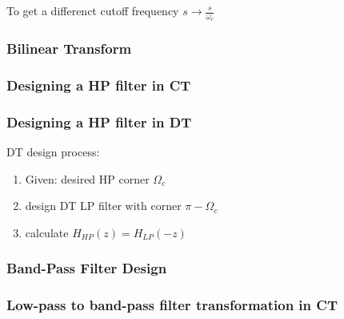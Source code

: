\documentclass[7pt,a4paper]{scrartcl}
\begin{document}
\begin{multicols*}{4}

To get a differenct cutoff frequency $s\rightarrow\frac{s}{\omega_c}$

\subsubsection*{Bilinear Transform}


\subsubsection*{Designing a HP filter in CT}



\subsubsection*{Designing a HP filter in DT}



DT design process:
\begin{enumerate}
\ncompaq
\item Given: desired HP corner $\Omega_c$
\item design DT LP filter with corner $\pi-\Omega_c$
\item calculate $H_{HP}(z)=H_{LP}(-z)$
\end{enumerate}

\subsubsection*{Band-Pass Filter Design}



\subsubsection*{Low-pass to band-pass filter transformation in CT}


\end{multicols*}
\end{document}
